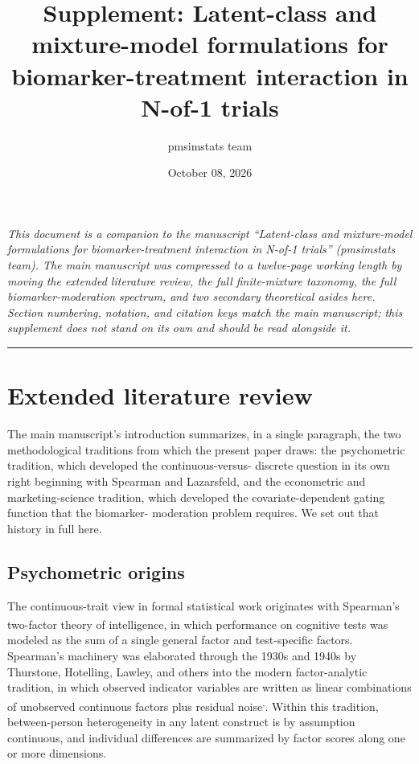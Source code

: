 \documentclass[
  11pt,
]{article}
\title{Supplement: Latent-class and mixture-model formulations for biomarker-treatment interaction in N-of-1 trials}
\author{pmsimstats team}
\date{October 08, 2026}
\begin{document}
\maketitle

{
\setcounter{tocdepth}{2}
\tableofcontents
}
\emph{This document is a companion to the manuscript ``Latent-class
and mixture-model formulations for biomarker-treatment interaction
in N-of-1 trials'' (pmsimstats team). The main manuscript was
compressed to a twelve-page working length by moving the extended
literature review, the full finite-mixture taxonomy, the full
biomarker-moderation spectrum, and two secondary theoretical asides
here. Section numbering, notation, and citation keys match the main
manuscript; this supplement does not stand on its own and should be
read alongside it.}

\bigskip\noindent

\rule{\textwidth}{0.4pt}\bigskip

\section{Extended literature review}\label{extended-literature-review}

The main manuscript's introduction summarizes, in a single paragraph,
the two methodological traditions from which the present paper draws:
the psychometric tradition, which developed the continuous-versus-
discrete question in its own right beginning with Spearman and
Lazarsfeld, and the econometric and marketing-science tradition, which
developed the covariate-dependent gating function that the biomarker-
moderation problem requires. We set out that history in full here.

\subsection{Psychometric origins}\label{psychometric-origins}

The continuous-trait view in formal statistical work originates with
Spearman's two-factor theory of intelligence\textsuperscript{}, in
which performance on cognitive tests was modeled as the sum of a
single general factor and test-specific factors. Spearman's machinery
was elaborated through the 1930s and 1940s by Thurstone, Hotelling,
Lawley, and others into the modern factor-analytic tradition, in which
observed indicator variables are written as linear combinations of
unobserved continuous factors plus residual noise\textsuperscript{,}. Within this tradition, between-person
heterogeneity in any latent construct is by assumption continuous, and
individual differences are summarized by factor scores along one or
more dimensions.
\end{document}
